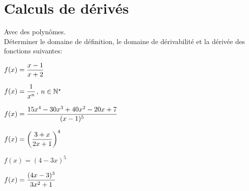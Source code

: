 \documentclass[a4paper, 11pt,reqno]{article}
\begin{document}
\noindent\section{\large{Calculs de d\'eriv\'es}}

\begin{exercice}  \; Avec des polyn\^omes.\\
	D\'eterminer le domaine de d\'efinition, le domaine de d\'erivabilit\'e et la d\'eriv\'ee des fonctions suivantes:
	\begin{enumerate}
		\begin{minipage}[t]{0.45\textwidth}
			\item $f(x)=\displaystyle\frac{x-1}{x+2}$
			\item $f(x)=\displaystyle\frac{1}{x^n}$, $n\in\mathbb{N}^{\star}$
			\item $f(x)=\displaystyle\frac{15x^4-30x^3+40x^2-20x+7}{(x-1)^5}$
		\end{minipage}
		\begin{minipage}[t]{0.45\textwidth}
			\item $f(x)=\left( \displaystyle\frac{3+x}{2x+1} \right)^4$
			\item $f(x)=(4-3x)^5$
			\item $f(x)=\displaystyle\frac{(4x-3)^3}{3x^2+1}$
		\end{minipage}
	\end{enumerate}
\end{exercice}
\end{document}
